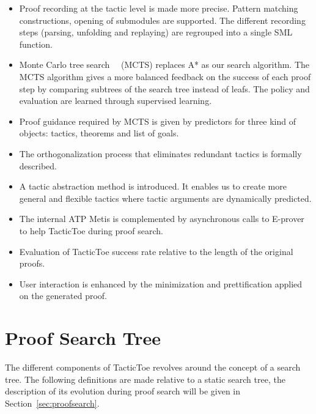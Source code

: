 \documentclass[runningheads,a4paper,draft]{svjour3}
\newcommand{\todoi}[1]{\todo[inline]{#1}}
\def\eprover{\textsf{E-prover}\xspace}
\def\sml{\textsf{SML}\xspace}
\def\metis{\textsf{Metis}\xspace}
\def\tactictoe{\textsf{TacticToe}\xspace}
\begin{document}
\begin{itemize}
\item Proof recording at the tactic level is made more precise. Pattern
matching constructions, opening of submodules are supported. The different
recording steps (parsing, unfolding and replaying) are regrouped into a single
\sml function.
\item Monte Carlo tree search~~\cite{montecarlo} (MCTS) replaces A* as our
search algorithm. The MCTS algorithm gives a more balanced feedback on
the success of
each proof step by
comparing subtrees of the search tree instead of leafs. The policy and
evaluation are learned
through supervised learning.
\item Proof guidance required by MCTS is given by predictors for
three kind of objects: tactics, theorems and list of goals.
\item The orthogonalization process that eliminates redundant tactics is
formally described.
\item A tactic abstraction method is introduced. It enables us to create
more general and flexible tactics where tactic arguments are dynamically
predicted.
\item The internal ATP \metis is complemented
by asynchronous calls to \eprover to help \tactictoe during proof search.
\todoi{More on evaluation??}
\item Evaluation of \tactictoe success rate relative to
the length of the original proofs.
\item User interaction is enhanced by the minimization and prettification
applied on the generated proof.
\end{itemize}


\section{Proof Search Tree}\label{sec:prelim}

The different components of \tactictoe revolves around the concept of a
search tree. The following definitions are made relative to a static search
tree, the description of its evolution during proof search will be given in
Section~\ref{sec:proofsearch}.
\end{document}
